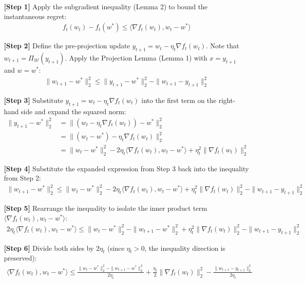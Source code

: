 \documentclass{article}
\begin{document}
\textbf{[Step 1]} Apply the subgradient inequality (Lemma 2) to bound the instantaneous regret:
\begin{align*}
f_t(w_t) - f_t(w^*) \leq \langle \nabla f_t(w_t), w_t - w^* \rangle
\end{align*}

\textbf{[Step 2]} Define the pre-projection update $y_{t+1} = w_t - \eta_t \nabla f_t(w_t)$. Note that $w_{t+1} = \Pi_{\mathcal{W}}(y_{t+1})$. Apply the Projection Lemma (Lemma 1) with $x = y_{t+1}$ and $w = w^*$:
\begin{align*}
\|w_{t+1} - w^*\|_2^2 \leq \|y_{t+1} - w^*\|_2^2 - \|w_{t+1} - y_{t+1}\|_2^2
\end{align*}

\textbf{[Step 3]} Substitute $y_{t+1} = w_t - \eta_t \nabla f_t(w_t)$ into the first term on the right-hand side and expand the squared norm:
\begin{align*}
\|y_{t+1} - w^*\|_2^2 &= \|(w_t - \eta_t \nabla f_t(w_t)) - w^*\|_2^2 \\
&= \|(w_t - w^*) - \eta_t \nabla f_t(w_t)\|_2^2 \\
&= \|w_t - w^*\|_2^2 - 2\eta_t \langle \nabla f_t(w_t), w_t - w^* \rangle + \eta_t^2 \|\nabla f_t(w_t)\|_2^2
\end{align*}

\textbf{[Step 4]} Substitute the expanded expression from Step 3 back into the inequality from Step 2:
\begin{align*}
\|w_{t+1} - w^*\|_2^2 \leq \|w_t - w^*\|_2^2 - 2\eta_t \langle \nabla f_t(w_t), w_t - w^* \rangle + \eta_t^2 \|\nabla f_t(w_t)\|_2^2 - \|w_{t+1} - y_{t+1}\|_2^2
\end{align*}

\textbf{[Step 5]} Rearrange the inequality to isolate the inner product term $\langle \nabla f_t(w_t), w_t - w^* \rangle$:
\begin{align*}
2\eta_t \langle \nabla f_t(w_t), w_t - w^* \rangle \leq \|w_t - w^*\|_2^2 - \|w_{t+1} - w^*\|_2^2 + \eta_t^2 \|\nabla f_t(w_t)\|_2^2 - \|w_{t+1} - y_{t+1}\|_2^2
\end{align*}

\textbf{[Step 6]} Divide both sides by $2\eta_t$ (since $\eta_t > 0$, the inequality direction is preserved):
\begin{align*}
\langle \nabla f_t(w_t), w_t - w^* \rangle \leq \frac{\|w_t - w^*\|_2^2 - \|w_{t+1} - w^*\|_2^2}{2\eta_t} + \frac{\eta_t}{2} \|\nabla f_t(w_t)\|_2^2 - \frac{\|w_{t+1} - y_{t+1}\|_2^2}{2\eta_t}
\end{align*}
\end{document}
